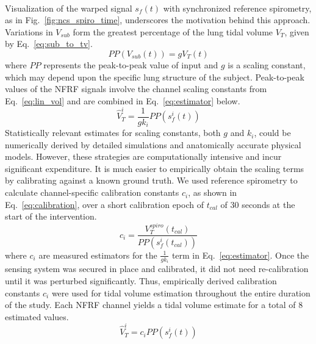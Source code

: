 \documentclass[journal,twoside,web]{ieeecolor}
\begin{document}
\\Visualization of the warped signal $s_f (t)$ with synchronized reference spirometry, as in Fig.~\ref{fig:ncs_spiro_time}, underscores the motivation behind this approach. Variations in $V_{sub}$ form the greatest percentage of the lung tidal volume $V_{T}$, given by Eq.~\ref{eq:sub_to_tv}. 
\begin{equation}
    PP(V_{sub} (t)) = g V_{T} (t)
    \label{eq:sub_to_tv}
\end{equation}
where $PP$ represents the peak-to-peak value of input and $g$ is a scaling constant, which may depend upon the specific lung structure of the subject. Peak-to-peak values of the NFRF signals involve the channel scaling constants from Eq.~\ref{eq:lin_vol} and are combined in Eq.~\ref{eq:estimator} below. 
\begin{equation}
    \hat{V}^{i}_{T} = \frac{1}{g k_i} PP(s_f^{i} (t))
    \label{eq:estimator}
\end{equation}
Statistically relevant estimates for scaling constants, both $g$ and $k_{i}$, could be numerically derived by detailed simulations and anatomically accurate physical models. However, these strategies are computationally intensive and incur significant expenditure. It is much easier to empirically obtain the scaling terms by calibrating against a known ground truth. We used reference spirometry to calculate channel-specific calibration constants $c_{i}$, as shown in Eq.~\ref{eq:calibration}, over a short calibration epoch of $t_{cal}$ of 30 seconds at the start of the intervention. 
\begin{equation}
        c_{i} = \frac{V^{spiro}_{T}(t_{cal})}{PP(s_f^{i} (t_{cal}))} 
    \label{eq:calibration}
\end{equation}
where $c_{i}$ are measured estimators for the $\frac{1}{gk_i}$ term in Eq.~\ref{eq:estimator}. Once the sensing system was secured in place and calibrated, it did not need re-calibration until it was perturbed significantly. Thus, empirically derived calibration constants $c_i$ were used for tidal volume estimation throughout the entire duration of the study. Each NFRF channel yields a tidal volume estimate for a total of 8 estimated values.
\begin{equation}
    \hat{V}^{i}_{T} = c_{i} PP(s_f^{i} (t))
    \label{eq:compute_tv}
\end{equation}
\end{document}
